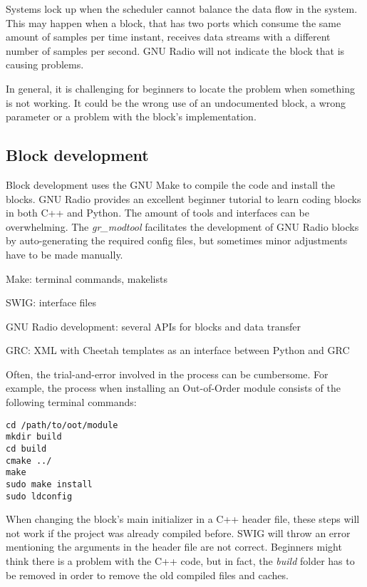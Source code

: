 Systems lock up when the scheduler cannot balance the data flow in the system. This may happen when a block, that has two ports which consume the same amount of samples per time instant, receives data streams with a different number of samples per second. GNU Radio will not indicate the block that is causing problems. \medskip

In general, it is challenging for beginners to locate the problem when something is not working. It could be the wrong use of an undocumented block, a wrong parameter or a problem with the block's implementation.

\subsection{Block development}
Block development uses the GNU Make to compile the code and install the blocks. GNU Radio provides an excellent beginner tutorial to learn coding blocks in both C++ and Python. The amount of tools and interfaces can be overwhelming. The \textit{gr\_modtool} facilitates the development of GNU Radio blocks by auto-generating the required config files, but sometimes minor adjustments have to be made manually.
\begin{tight_itemize}
\item Make: terminal commands, makelists
\item SWIG: interface files
\item GNU Radio development: several APIs for blocks and data transfer
\item GRC: XML with Cheetah templates as an interface between Python and GRC
\end{tight_itemize}
Often, the trial-and-error involved in the process can be cumbersome. For example, the process when installing an Out-of-Order module consists of the following terminal commands:
\begin{verbatim}
cd /path/to/oot/module
mkdir build
cd build
cmake ../
make
sudo make install
sudo ldconfig
\end{verbatim}
When changing the block's main initializer in a C++ header file, these steps will not work if the project was already compiled before.  SWIG will throw an error mentioning the arguments in the header file are not correct. Beginners might think there is a problem with the C++ code, but in fact, the \textit{build} folder has to be removed in order to remove the old compiled files and caches.
